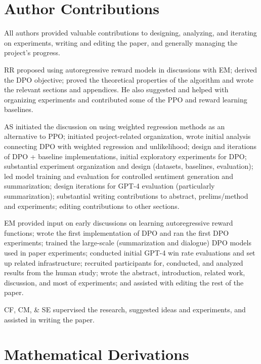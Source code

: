 \documentclass{article}
\begin{document}



\appendix
\section*{Author Contributions}
All authors provided valuable contributions to designing, analyzing, and iterating on experiments, writing and editing the paper, and generally managing the project’s progress.

RR proposed using autoregressive reward models in discussions with EM; derived the DPO objective; proved the theoretical properties of the algorithm and wrote the relevant sections and appendices. He also suggested and helped with organizing experiments and contributed some of the PPO and reward learning baselines.

AS initiated the discussion on using weighted regression methods as an alternative to PPO;
initiated project-related organization, wrote initial analysis connecting DPO with weighted regression and unlikelihood; design and iterations of DPO + baseline implementations, initial exploratory experiments for DPO; substantial experiment organization and design (datasets, baselines, evaluation); led model training and evaluation for controlled sentiment generation and summarization; design iterations for GPT-4 evaluation (particularly summarization); substantial writing contributions to abstract, prelims/method and experiments; editing contributions to other sections.

EM provided input on early discussions on learning autoregressive reward functions; wrote the first implementation of DPO and ran the first DPO experiments; trained the large-scale (summarization and dialogue) DPO models used in paper experiments; conducted initial GPT-4 win rate evaluations and set up related infrastructure; recruited participants for, conducted, and analyzed results from the human study; wrote the abstract, introduction, related work, discussion, and most of experiments; and assisted with editing the rest of the paper.

CF, CM, \& SE supervised the research, suggested ideas and experiments, and assisted in writing the paper.

\section{Mathematical Derivations}
\end{document}
